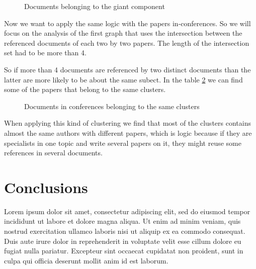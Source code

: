 \documentclass[article,twocolumn]{IEEEtran}
\begin{document}
    \begin{figure}
        \begin{center}\end{center}
        \caption{Documents belonging to the giant component}
        \label{fig10}
    \end{figure}
    
    Now we want to apply the same logic with the papers in-conferences. So
we will focus on the analysis of the first graph that uses the
intersection between the referenced documents of each two by two papers.
The length of the intersection set had to be more than 4.

So if more than 4 documents are referenced by two distinct documents
than the latter are more likely to be about the same subect. In the
table \ref{fig11} we can find some of the papers that belong to the same
clusters.


    \begin{figure}
        \begin{center}\end{center}
        \caption{Documents in conferences belonging to the same clusters}
        \label{fig11}
    \end{figure}
    
    When applying this kind of clustering we find that most of the clusters
contains almost the same authors with different papers, which is logic
because if they are specialists in one topic and write several papers on
it, they might reuse some references in several documents.

    \hypertarget{conclusions}{%
\section{Conclusions}\label{conclusions}}

Lorem ipsum dolor sit amet, consectetur adipiscing elit, sed do eiusmod
tempor incididunt ut labore et dolore magna aliqua. Ut enim ad minim
veniam, quis nostrud exercitation ullamco laboris nisi ut aliquip ex ea
commodo consequat. Duis aute irure dolor in reprehenderit in voluptate
velit esse cillum dolore eu fugiat nulla pariatur. Excepteur sint
occaecat cupidatat non proident, sunt in culpa qui officia deserunt
mollit anim id est laborum.
\newpage

    
    



    
    
\end{document}
